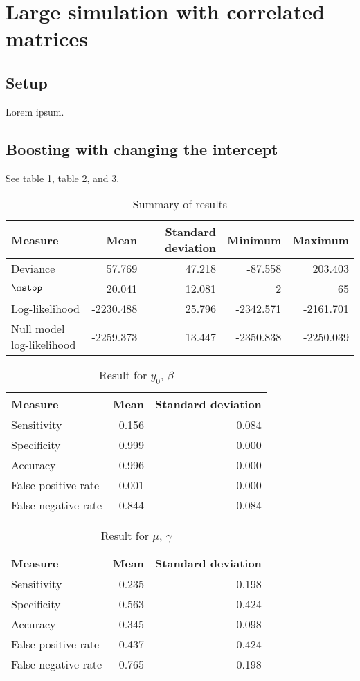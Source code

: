 \section{Large simulation with correlated matrices}
\subsection{Setup}
Lorem ipsum.

\subsection{Boosting with changing the intercept}
See table \ref{table:correlated-intercept-summary}, table \ref{table:correlated-intercept-y0}, and \ref{table:correlated-intercept-mu}.
\begin{table}\caption{Summary of results}\label{table:correlated-intercept-summary}
\begin{tabular}{l|rrrr}
Measure &    Mean &     Standard deviation &  Minimum & Maximum \\
\hline
Deviance    &    57.769 & 47.218 &   -87.558 &   203.403 \\
$\mstop$      &    20.041 & 12.081 &     2 &    65 \\
Log-likelihood      & -2230.488 & 25.796 & -2342.571 & -2161.701 \\
Null model log-likelihood & -2259.373 & 13.447 & -2350.838 & -2250.039
\end{tabular}
\end{table}

\begin{table}\caption{Result for $y_0$, $\beta$}\label{table:correlated-intercept-y0}
\begin{tabular}{l|rr}
Measure &  Mean &    Standard deviation \\
\hline
Sensitivity & 0.156 & 0.084 \\
Specificity & 0.999 & 0.000 \\
Accuracy    & 0.996 & 0.000 \\
False positive rate         & 0.001 & 0.000 \\
False negative rate         & 0.844 & 0.084
\end{tabular}
\end{table}


\begin{table}\caption{Result for $\mu$, $\gamma$}\label{table:correlated-intercept-mu}
\begin{tabular}{l|rr}
Measure     & Mean   & Standard deviation     \\
\hline
Sensitivity & 0.235 & 0.198 \\
Specificity & 0.563 & 0.424 \\
Accuracy    & 0.345 & 0.098 \\
False positive rate         & 0.437 & 0.424 \\
False negative rate         & 0.765 & 0.198
\end{tabular}
\end{table}

